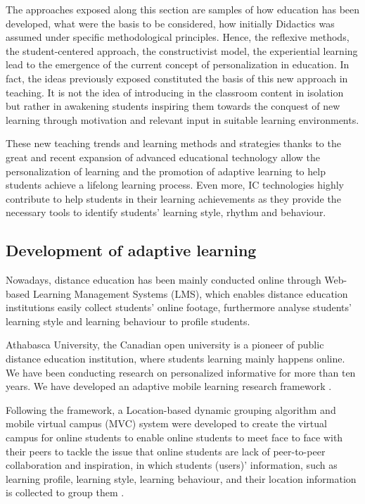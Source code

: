 \documentclass[english]{textolivre}
\begin{document}
The approaches exposed along this section are samples of how education has been developed, what were the basis to be considered, how initially Didactics was assumed under specific methodological principles. Hence, the reflexive methods, the student-centered approach, the constructivist model, the experiential learning lead to the emergence of the current concept of personalization in education. In fact, the ideas previously exposed constituted the basis of this new approach in teaching. It is not the idea of introducing in the classroom content in isolation but rather in awakening students inspiring them towards the conquest of new learning through motivation and relevant input in suitable learning environments.

These new teaching trends and learning methods and strategies thanks to the great and recent expansion of advanced educational technology allow the personalization of learning and the promotion of adaptive learning to help students achieve a lifelong learning process. Even more, IC technologies highly contribute to help students in their learning achievements as they provide the necessary tools to identify students’ learning style, rhythm and behaviour.

\subsection{Development of adaptive learning}
Nowadays, distance education has been mainly conducted online through Web-based Learning Management Systems (LMS), which enables distance education institutions easily collect students’ online footage, furthermore analyse students’ learning style and learning behaviour to profile students.

Athabasca University, the Canadian open university is a pioneer of public distance education institution, where students learning mainly happens online. We have been conducting research on personalized informative for more than ten years. We have developed an adaptive mobile learning research framework \cite[p. 12]{tan2010}.

Following the framework, a Location-based dynamic grouping algorithm and mobile virtual campus (MVC) system were developed to create the virtual campus for online students to enable online students to meet face to face with their peers to tackle the issue that online students are lack of peer-to-peer collaboration and inspiration, in which students (users)’ information, such as learning profile, learning style, learning behaviour, and their location information is collected to group them \cite[p. 55]{tan2010}.
\end{document}
